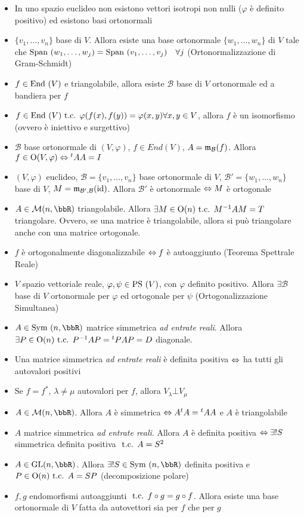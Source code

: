 \documentclass[a4paper,NoNotes,GeneralMath]{stdmdoc}
\begin{document}
	\begin{itemize}
		\item In uno spazio euclideo non esistono vettori isotropi non nulli ($\varphi$ è definito positivo) ed esistono basi ortonormali
		\item $\{v_1, \ldots, v_n\}$ base di $V$. Allora esiste una base ortonormale $\{w_1, \ldots, w_n\}$ di $V$ tale che $\mbox{Span }(w_1, \ldots, w_j) = \mbox{Span }(v_1, \ldots, v_j) \quad \forall j$ (Ortonormalizzazione di Gram-Schmidt)
		\item $f \in \mbox{End }(V)$ e triangolabile, allora esiste $\mathcal{B}$ base di $V$ ortonormale ed a bandiera per $f$
		\item $f \in \mbox{End }(V) \mbox{ t.c. } \varphi(f(x), f(y)) = \varphi(x, y) \forall x, y \in V$, allora $f$ è un isomorfismo (ovvero è iniettivo e surgettivo)
		\item $\mathcal{B}$ base ortonormale di $(V, \varphi)$, $f \in End(V)$, $A = \mathfrak{m}_{\mathcal{B}}(f)$. Allora $f \in \mbox{O}(V, \varphi) \Leftrightarrow {}^tA A = I$
		\item $(V, \varphi)$ euclideo, $\mathcal{B} = \{v_1, \ldots, v_n\}$ base ortonormale di $V$, $\mathcal{B'} = \{w_1, \ldots, w_n\}$ base di $V$, $M = \mathfrak{m}_{\mathcal{B'}, \mathcal{B}}(\mbox{id})$. Allora $\mathcal{B'}$ è ortonormale $\Leftrightarrow M$ è ortogonale
		\item $A \in \mathcal{M}(n,\bbR)$ triangolabile. Allora $\exists M \in \mbox{O}(n) \mbox{ t.c. } M^{-1}AM = T$ triangolare. Ovvero, se una matrice è triangolabile, allora si può triangolare anche con una matrice ortogonale.
		\item $f$ è ortogonalmente diagonalizzabile $\Leftrightarrow f$ è autoaggiunto (Teorema Spettrale Reale)
		\item $V$ spazio vettoriale reale, $\varphi, \psi \in \mbox{PS }(V)$, con $\varphi$ definito positivo. Allora $\exists \mathcal{B}$ base di $V$ ortonormale per $\varphi$ ed ortogonale per $\psi$ (Ortogonalizzazione Simultanea)
		\item $A \in \Symm(n, \bbR)$ matrice simmetrica {\it ad entrate reali}. Allora $\exists P \in \mbox{O}(n) \mbox{ t.c. } P^{-1}AP = {}^tPAP = D$ diagonale.
		\item Una matrice simmetrica {\it ad entrate reali} è definita positiva $\Leftrightarrow$ ha tutti gli autovalori positivi
		\item Se $f = f^{*}$, $\lambda \neq \mu$ autovalori per $f$, allora $V_\lambda \bot V_\mu$
		\item $A \in \mathcal{M}(n, \bbR)$. Allora $A$ è simmetrica $\Leftrightarrow A {}^tA = {}^tAA$ e $A$ è triangolabile
		\item $A$ matrice simmetrica {\it ad entrate reali}. Allora $A$ è definita positiva $\Leftrightarrow \exists ! S$ simmetrica definita positiva $\mbox{ t.c. } A = S^2$
		\item $A \in \GL(n, \bbR)$. Allora $\exists ! S \in \Symm(n, \bbR)$ definita positiva e $P \in \mbox{O}(n) \mbox{ t.c. } A = SP$ (decomposizione polare)
		\item $f, g$ endomorfismi autoaggiunti $\mbox{ t.c. } f \circ g = g \circ f$. Allora esiste una base ortonormale di $V$ fatta da autovettori sia per $f$ che per $g$
	\end{itemize}
\end{document}
